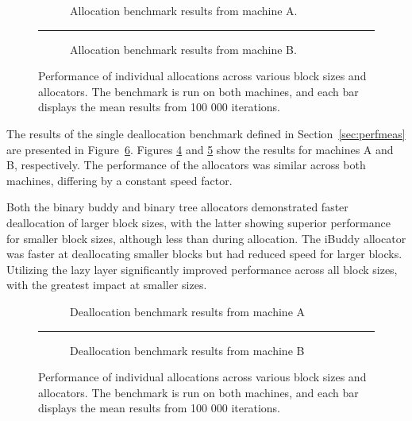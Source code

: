 \begin{figure}[h]
  \centering
  \begin{subfigure}{\textwidth}
    \centering
    \captionsetup{justification=centering}
    
    \caption{Allocation benchmark results from machine A.}
    \label{fig:allocA}
  \end{subfigure}
  \vspace{-0.5cm}
  \rule{\textwidth}{0.1pt}
  \begin{subfigure}{\textwidth}
    \centering
    \captionsetup{justification=centering}
    
    \caption{Allocation benchmark results from machine B.}
    \label{fig:allocB}
  \end{subfigure}
  \caption{Performance of individual allocations across various block sizes and allocators. The benchmark is run on both machines, and each bar displays the mean results from 100 000 iterations.}
  \label{fig:allocbenchmark}
\end{figure}

\FloatBarrier

The results of the single deallocation benchmark defined in Section~\ref{sec:perfmeas} are presented in Figure~\ref{fig:deallocbenchmark}. Figures \ref{fig:deallocA} and \ref{fig:deallocB} show the results for machines A and B, respectively. The performance of the allocators was similar across both machines, differing by a constant speed factor.

Both the binary buddy and binary tree allocators demonstrated faster deallocation of larger block sizes, with the latter showing superior performance for smaller block sizes, although less than during allocation. The iBuddy allocator was faster at deallocating smaller blocks but had reduced speed for larger blocks. Utilizing the lazy layer significantly improved performance across all block sizes, with the greatest impact at smaller sizes.

\begin{figure}[h]
  \centering
  \begin{subfigure}{\textwidth}
    \centering
    \captionsetup{justification=centering}
    
    \caption{Deallocation benchmark results from machine A}
    \label{fig:deallocA}
  \end{subfigure}
  \rule{\textwidth}{0.1pt}
  \begin{subfigure}{\textwidth}
    \centering
    \captionsetup{justification=centering}
    
    \caption{Deallocation benchmark results from machine B}
    \label{fig:deallocB}
  \end{subfigure}
  \caption{Performance of individual allocations across various block sizes and allocators. The benchmark is run on both machines, and each bar displays the mean results from 100 000 iterations.}
  \label{fig:deallocbenchmark}
\end{figure}

